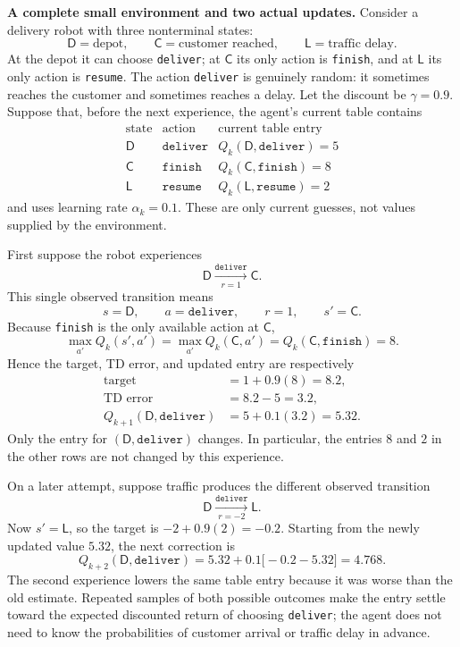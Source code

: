 \documentclass[11pt,a4paper]{article}
\theoremstyle{definition}
\begin{document}
\begin{note}
\medskip\noindent\textbf{A complete small environment and two actual updates.}
Consider a delivery robot with three nonterminal states:
\[
\mathsf{D}=\text{depot},\qquad
\mathsf{C}=\text{customer reached},\qquad
\mathsf{L}=\text{traffic delay}.
\]
At the depot it can choose \texttt{deliver}; at $\mathsf{C}$ its only action is
\texttt{finish}, and at $\mathsf{L}$ its only action is \texttt{resume}. The action
\texttt{deliver} is genuinely random: it sometimes reaches the customer and sometimes reaches
a delay. Let the discount be $\gamma=0.9$. Suppose that, before the next experience, the
agent's current table contains
\[
\begin{array}{c|c|c}
\text{state} & \text{action} & \text{current table entry}\\
\hline
\mathsf{D} & \texttt{deliver} & Q_k(\mathsf{D},\texttt{deliver})=5\\
\mathsf{C} & \texttt{finish} & Q_k(\mathsf{C},\texttt{finish})=8\\
\mathsf{L} & \texttt{resume} & Q_k(\mathsf{L},\texttt{resume})=2
\end{array}
\]
and uses learning rate $\alpha_k=0.1$. These are only current guesses, not values supplied by
the environment.

First suppose the robot experiences
\[
\mathsf{D}
\xrightarrow[\;r=1\;]{\texttt{deliver}}
\mathsf{C}.
\]
This single observed transition means
\[
s=\mathsf{D},\qquad
a=\texttt{deliver},\qquad
r=1,\qquad
s'=\mathsf{C}.
\]
Because \texttt{finish} is the only available action at $\mathsf{C}$,
\[
\max_{a'}Q_k(s',a')
=\max_{a'}Q_k(\mathsf{C},a')
=Q_k(\mathsf{C},\texttt{finish})
=8.
\]
Hence the target, TD error, and updated entry are respectively
\[
\begin{aligned}
\text{target}&=1+0.9(8)=8.2,\\
\text{TD error}&=8.2-5=3.2,\\
Q_{k+1}(\mathsf{D},\texttt{deliver})
&=5+0.1(3.2)=5.32.
\end{aligned}
\]
Only the entry for $(\mathsf{D},\texttt{deliver})$ changes. In particular, the entries $8$ and
$2$ in the other rows are not changed by this experience.

On a later attempt, suppose traffic produces the different observed transition
\[
\mathsf{D}
\xrightarrow[\;r=-2\;]{\texttt{deliver}}
\mathsf{L}.
\]
Now $s'=\mathsf{L}$, so the target is $-2+0.9(2)=-0.2$. Starting from the newly updated value
$5.32$, the next correction is
\[
Q_{k+2}(\mathsf{D},\texttt{deliver})
=5.32+0.1\bigl[-0.2-5.32\bigr]
=4.768.
\]
The second experience lowers the same table entry because it was worse than the old estimate.
Repeated samples of both possible outcomes make the entry settle toward the expected
discounted return of choosing \texttt{deliver}; the agent does not need to know the
probabilities of customer arrival or traffic delay in advance.
\end{note}
\end{document}
